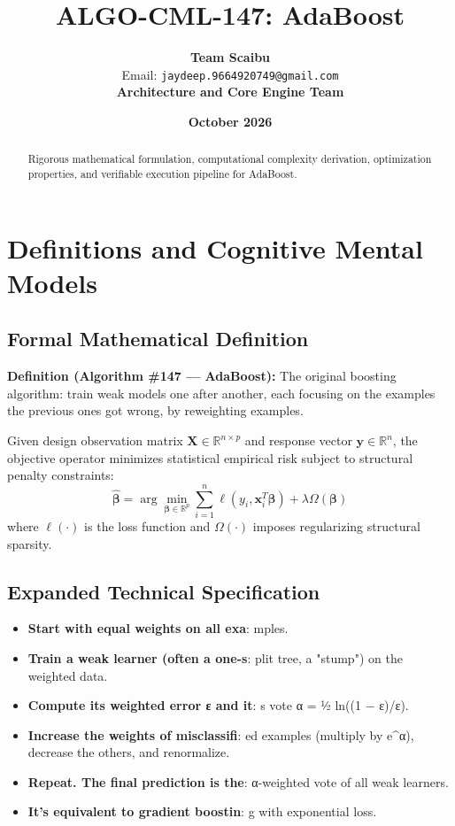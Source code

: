 \documentclass[11pt,a4paper]{article}
\title{\textbf{ALGO-CML-147: AdaBoost}}
\author{\textbf{Team Scaibu} \\ \small Email: \texttt{jaydeep.9664920749@gmail.com} \\ \small \textbf{Architecture and Core Engine Team}}
\date{\textbf{October 2026}}
\theoremstyle{definition}
\begin{document}
\maketitle

\begin{abstract}
Rigorous mathematical formulation, computational complexity derivation, optimization properties, and verifiable execution pipeline for AdaBoost.
\end{abstract}

\section{Definitions and Cognitive Mental Models}

\subsection{Formal Mathematical Definition}
\textbf{Definition (Algorithm \#147 --- AdaBoost):}
The original boosting algorithm: train weak models one after another, each focusing on the examples the previous ones got wrong, by reweighting examples.

Given design observation matrix $\mathbf{X} \in \mathbb{R}^{n \times p}$ and response vector $\mathbf{y} \in \mathbb{R}^n$, the objective operator minimizes statistical empirical risk subject to structural penalty constraints:
\begin{equation}
\hat{\boldsymbol{\beta}} = \arg\min_{\boldsymbol{\beta} \in \mathbb{R}^p} \sum_{i=1}^n \ell(y_i, \mathbf{x}_i^T \boldsymbol{\beta}) + \lambda \Omega(\boldsymbol{\beta})
\end{equation}
where $\ell(\cdot)$ is the loss function and $\Omega(\cdot)$ imposes regularizing structural sparsity.

\subsection{Expanded Technical Specification}
\begin{itemize}
\item \textbf{Start with equal weights on all exa}: mples.
\item \textbf{Train a weak learner (often a one-s}: plit tree, a "stump") on the weighted data.
\item \textbf{Compute its weighted error ε and it}: s vote α = ½ ln((1 − ε)/ε).
\item \textbf{Increase the weights of misclassifi}: ed examples (multiply by e^α), decrease the others, and renormalize.
\item \textbf{Repeat. The final prediction is the}:  α-weighted vote of all weak learners.
\item \textbf{It's equivalent to gradient boostin}: g with exponential loss.
\end{itemize}
\end{document}

